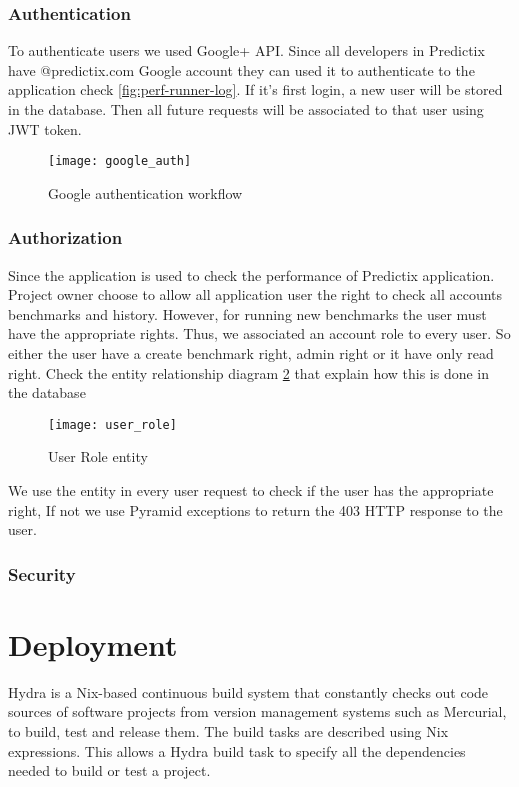 \subsubsection{Authentication}
To authenticate users we used Google+ API. Since all developers in Predictix
have @predictix.com Google account they can used it to authenticate to the
application check \hyperref[fig:perf-runner-log]{\ref{fig:perf-runner-log}}. If
it's first login, a new user will be stored in the database. Then all future
requests will be associated to that user using JWT token.

\begin{figure}[h]
  \centerline{\texttt{[image: google\_auth]}}
\caption{Google authentication workflow}
\label{fig:google_auth}
\end{figure}

\subsubsection{Authorization}
Since the application is used to check the performance of Predictix application.
Project owner choose to allow all application user the right to check all
accounts benchmarks and history. However, for running new benchmarks the user
must have the appropriate rights. Thus, we associated an account role to every
user. So either the user have a create benchmark right, admin right or it have
only read right. Check the entity relationship diagram
\hyperref[fig:user_role]{\ref{fig:user_role}} that explain how this is
done in the database
\begin{figure}[h]
  \centerline{\texttt{[image: user\_role]}}
\caption{User Role entity}
\label{fig:user_role}
\end{figure}
We use the entity in every user request to check if the user has the appropriate
right, If not we use Pyramid exceptions to return the 403 HTTP response to the
user.

\subsubsection{Security}

\section{Deployment}
Hydra is a Nix-based continuous build system that constantly checks out code
sources of software projects from version management systems such as Mercurial,
to build, test and release them. The build tasks are described using Nix
expressions. This allows a Hydra build task to specify all the dependencies
needed to build or test a project.

